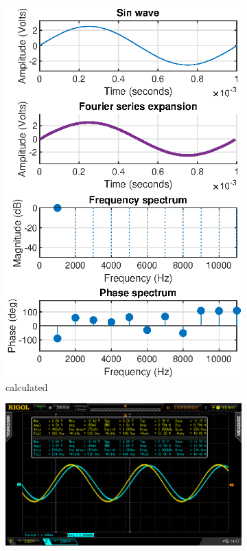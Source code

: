 \documentclass[notitlepage, a4paper, 11pt]{article}
\begin{document}
	\begin{figure}[H]
		\centering
		\begin{subfigure}[][][t]{0.28\textwidth}
			\includegraphics[width=\textwidth]{../Matlab/img/sin}
			\caption{calculated}
			\label{fig:calc-signals-a}
		\end{subfigure}
		\quad
		\begin{subfigure}[][][t]{0.28\textwidth}
			\includegraphics[width=\textwidth, trim=85 50 112 45, clip]{../img/osc/DS2_QuickPrint5.png}

\end{subfigure}
\end{figure}
\end{document}
